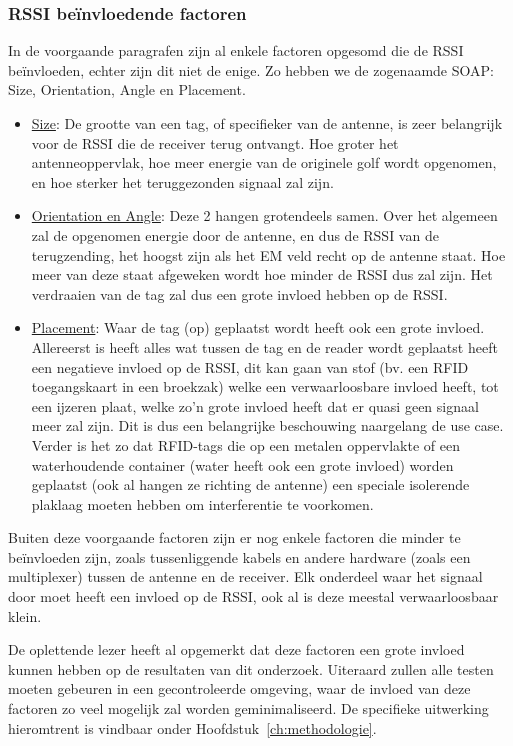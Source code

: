 \subsubsection{RSSI beïnvloedende factoren}
\label{sec:RSSI beïnvloedende factoren}
In de voorgaande paragrafen zijn al enkele factoren opgesomd die de RSSI beïnvloeden, echter zijn dit niet de enige. Zo hebben we de zogenaamde SOAP: Size, Orientation, Angle en Placement.
\begin{itemize}
	\item \underline{Size}:
	De grootte van een tag, of specifieker van de antenne, is zeer belangrijk voor de RSSI die de receiver terug ontvangt. Hoe groter het antenneoppervlak, hoe meer energie van de originele golf wordt opgenomen, en hoe sterker het teruggezonden signaal zal zijn.
	\item \underline{Orientation en Angle}:
	Deze 2 hangen grotendeels samen. Over het algemeen zal de opgenomen energie door de antenne, en dus de RSSI van de terugzending, het hoogst zijn als het EM veld recht op de antenne staat. Hoe meer van deze staat afgeweken wordt hoe minder de RSSI dus zal zijn. Het verdraaien van de tag zal dus een grote invloed hebben op de RSSI. 
	\item \underline{Placement}:
	Waar de tag (op) geplaatst wordt heeft ook een grote invloed. Allereerst is heeft alles wat tussen de tag en de reader wordt geplaatst heeft een negatieve invloed op de RSSI, dit kan gaan van stof (bv. een RFID toegangskaart in een broekzak) welke een verwaarloosbare invloed heeft, tot een ijzeren plaat, welke zo'n grote invloed heeft dat er quasi geen signaal meer zal zijn. Dit is dus een belangrijke beschouwing naargelang de use case. Verder is het zo dat RFID-tags die op een metalen oppervlakte of een waterhoudende container (water heeft ook een grote invloed) worden geplaatst (ook al hangen ze richting de antenne) een speciale isolerende plaklaag moeten hebben om interferentie te voorkomen.
\end{itemize}

Buiten deze voorgaande factoren zijn er nog enkele factoren die minder te beïnvloeden zijn, zoals tussenliggende kabels en andere hardware (zoals een multiplexer) tussen de antenne en de receiver. Elk onderdeel waar het signaal door moet heeft een invloed op de RSSI, ook al is deze meestal verwaarloosbaar klein.\autocite{Armstrong2013}

De oplettende lezer heeft al opgemerkt dat deze factoren een grote invloed kunnen hebben op de resultaten van dit onderzoek. Uiteraard zullen alle testen moeten gebeuren in een gecontroleerde omgeving, waar de invloed van deze factoren zo veel mogelijk zal worden geminimaliseerd. De specifieke uitwerking hieromtrent is vindbaar onder Hoofdstuk~\ref{ch:methodologie}.

